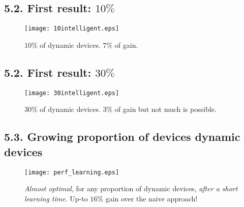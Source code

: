 \subsection{\hfill{}5.2. First result: $10\%$\hfill{}}

\begin{frameO}

    \begin{figure}[h!]
        \centering
        \texttt{[image: 10intelligent.eps]}
        \caption{\small{$10\%$ of dynamic devices. $7\%$ of gain.}}
    \end{figure}

\end{frameO}



\subsection{\hfill{}5.2. First result: $30\%$\hfill{}}

\begin{frameO}

    \begin{figure}[h!]
        \centering
        \texttt{[image: 30intelligent.eps]}
        \caption{\small{$30\%$ of dynamic devices.} $3\%$ of gain but not much is possible.}
    \end{figure}

\end{frameO}



\subsection{\hfill{}5.3. Growing proportion of devices dynamic devices\hfill{}}

\begin{frameO}[Dependency on \(D/(S+D)\)]

    \begin{figure}[h!]
        \centering
        \texttt{[image: perf\_learning.eps]}
        \caption{\small{\emph{Almost optimal}, for any proportion of dynamic devices, \emph{after a short learning time}. Up-to $16\%$ gain over the naive approach!}}
    \end{figure}

\end{frameO}
